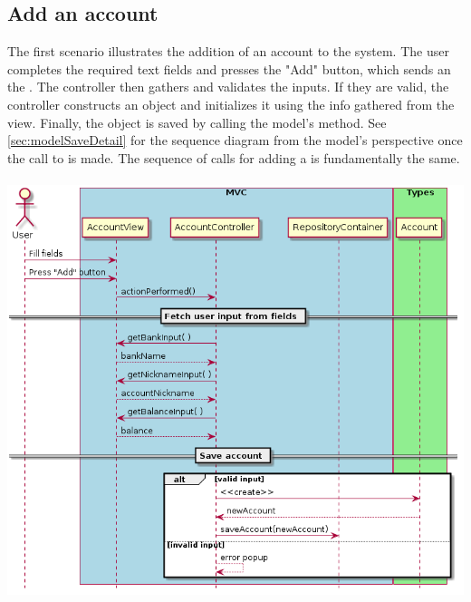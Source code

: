 \documentclass[12pt]{article}
\begin{document}
\subsection{Add an account} \label{sec:addAccount}
The first scenario illustrates the addition of an account to the system. The user completes the required text fields and presses the "Add" button, which sends an  the . The controller then gathers and validates the inputs. If they are valid, the controller constructs an  object and initializes it using the info gathered from the view. Finally, the object is saved by calling the model's  method. See \ref{sec:modelSaveDetail} for the sequence diagram from the model's perspective once the call to  is made. The sequence of calls for adding a  is fundamentally the same.\\
\\
\includegraphics[width=\textwidth,height=\textheight,keepaspectratio]{diagrams/sequence/addAccount.png}
\bigskip
\end{document}
